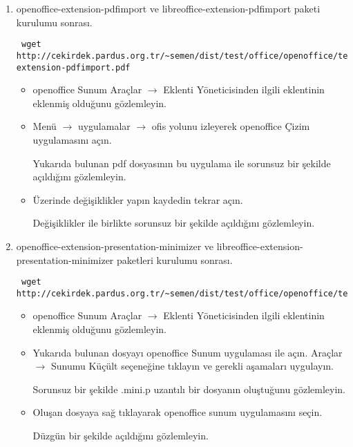 \documentclass[a4paper,10pt]{article}
\begin{document}
\begin{enumerate}
 \item openoffice-extension-pdfimport ve  libreoffice-extension-pdfimport paketi kurulumu sonrası.
\begin{verbatim}
 wget http://cekirdek.pardus.org.tr/~semen/dist/test/office/openoffice/test_openoffice-extension-pdfimport.pdf
\end{verbatim}

\begin{itemize}
\item openoffice Sunum Araçlar $\rightarrow$ Eklenti Yöneticisinden ilgili eklentinin eklenmiş olduğunu gözlemleyin.

\item Menü $\rightarrow$ uygulamalar $\rightarrow$ ofis yolunu izleyerek openoffice Çizim uygulamasını açın.

Yukarıda bulunan pdf dosyasının bu uygulama ile sorunsuz bir şekilde açıldığını gözlemleyin.

\item Üzerinde değişiklikler yapın kaydedin tekrar açın.

Değişiklikler ile birlikte sorunsuz bir şekilde açıldığını gözlemleyin.

\end{itemize}
 
\item openoffice-extension-presentation-minimizer ve libreoffice-extension-presentation-minimizer paketleri kurulumu sonrası.
\begin{verbatim}
 wget http://cekirdek.pardus.org.tr/~semen/dist/test/office/openoffice/test_ooimpress.odp
\end{verbatim}

\begin{itemize}
\item openoffice Sunum Araçlar $\rightarrow$ Eklenti Yöneticisinden ilgili eklentinin eklenmiş olduğunu gözlemleyin.

\item Yukarıda bulunan dosyayı openoffice Sunum uygulaması ile açın. Araçlar  $\rightarrow$  Sunumu Küçült seçeneğine tıklayın ve gerekli aşamaları uygulayın.

Sorunsuz bir şekilde .mini.p uzantılı bir dosyanın oluştuğunu gözlemleyin.

\item Oluşan dosyaya sağ tıklayarak openoffice sunum uygulamasını seçin.

Düzgün bir şekilde açıldığını gözlemleyin.

\end{itemize}
 

\end{enumerate}
\end{document}
